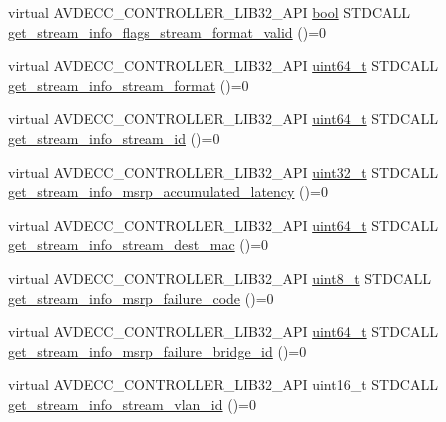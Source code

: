 \begin{DoxyCompactItemize}
\item 
virtual A\+V\+D\+E\+C\+C\+\_\+\+C\+O\+N\+T\+R\+O\+L\+L\+E\+R\+\_\+\+L\+I\+B32\+\_\+\+A\+PI \hyperlink{avb__gptp_8h_af6a258d8f3ee5206d682d799316314b1}{bool} S\+T\+D\+C\+A\+LL \hyperlink{classavdecc__lib_1_1stream__output__get__stream__info__response_aea35630b9925143d69bb4997c392b0d5}{get\+\_\+stream\+\_\+info\+\_\+flags\+\_\+stream\+\_\+format\+\_\+valid} ()=0
\item 
virtual A\+V\+D\+E\+C\+C\+\_\+\+C\+O\+N\+T\+R\+O\+L\+L\+E\+R\+\_\+\+L\+I\+B32\+\_\+\+A\+PI \hyperlink{parse_8c_aec6fcb673ff035718c238c8c9d544c47}{uint64\+\_\+t} S\+T\+D\+C\+A\+LL \hyperlink{classavdecc__lib_1_1stream__output__get__stream__info__response_a44d4cdbe40182ecac3559f462a52fb6c}{get\+\_\+stream\+\_\+info\+\_\+stream\+\_\+format} ()=0
\item 
virtual A\+V\+D\+E\+C\+C\+\_\+\+C\+O\+N\+T\+R\+O\+L\+L\+E\+R\+\_\+\+L\+I\+B32\+\_\+\+A\+PI \hyperlink{parse_8c_aec6fcb673ff035718c238c8c9d544c47}{uint64\+\_\+t} S\+T\+D\+C\+A\+LL \hyperlink{classavdecc__lib_1_1stream__output__get__stream__info__response_a075bc859c84291de462603064f31dd06}{get\+\_\+stream\+\_\+info\+\_\+stream\+\_\+id} ()=0
\item 
virtual A\+V\+D\+E\+C\+C\+\_\+\+C\+O\+N\+T\+R\+O\+L\+L\+E\+R\+\_\+\+L\+I\+B32\+\_\+\+A\+PI \hyperlink{parse_8c_a6eb1e68cc391dd753bc8ce896dbb8315}{uint32\+\_\+t} S\+T\+D\+C\+A\+LL \hyperlink{classavdecc__lib_1_1stream__output__get__stream__info__response_ae4d4e7b9a2c69eb93fc7e277cc14a968}{get\+\_\+stream\+\_\+info\+\_\+msrp\+\_\+accumulated\+\_\+latency} ()=0
\item 
virtual A\+V\+D\+E\+C\+C\+\_\+\+C\+O\+N\+T\+R\+O\+L\+L\+E\+R\+\_\+\+L\+I\+B32\+\_\+\+A\+PI \hyperlink{parse_8c_aec6fcb673ff035718c238c8c9d544c47}{uint64\+\_\+t} S\+T\+D\+C\+A\+LL \hyperlink{classavdecc__lib_1_1stream__output__get__stream__info__response_a81e48c219d69340880c1698e196d644e}{get\+\_\+stream\+\_\+info\+\_\+stream\+\_\+dest\+\_\+mac} ()=0
\item 
virtual A\+V\+D\+E\+C\+C\+\_\+\+C\+O\+N\+T\+R\+O\+L\+L\+E\+R\+\_\+\+L\+I\+B32\+\_\+\+A\+PI \hyperlink{stdint_8h_aba7bc1797add20fe3efdf37ced1182c5}{uint8\+\_\+t} S\+T\+D\+C\+A\+LL \hyperlink{classavdecc__lib_1_1stream__output__get__stream__info__response_ac6de72a4fceb3b08ac797689cd04c213}{get\+\_\+stream\+\_\+info\+\_\+msrp\+\_\+failure\+\_\+code} ()=0
\item 
virtual A\+V\+D\+E\+C\+C\+\_\+\+C\+O\+N\+T\+R\+O\+L\+L\+E\+R\+\_\+\+L\+I\+B32\+\_\+\+A\+PI \hyperlink{parse_8c_aec6fcb673ff035718c238c8c9d544c47}{uint64\+\_\+t} S\+T\+D\+C\+A\+LL \hyperlink{classavdecc__lib_1_1stream__output__get__stream__info__response_a8873569631d5d34b648931d4a669cbfe}{get\+\_\+stream\+\_\+info\+\_\+msrp\+\_\+failure\+\_\+bridge\+\_\+id} ()=0
\item 
virtual A\+V\+D\+E\+C\+C\+\_\+\+C\+O\+N\+T\+R\+O\+L\+L\+E\+R\+\_\+\+L\+I\+B32\+\_\+\+A\+PI uint16\+\_\+t S\+T\+D\+C\+A\+LL \hyperlink{classavdecc__lib_1_1stream__output__get__stream__info__response_a0f6668da1219c2499b298ef387179642}{get\+\_\+stream\+\_\+info\+\_\+stream\+\_\+vlan\+\_\+id} ()=0
\end{DoxyCompactItemize}


